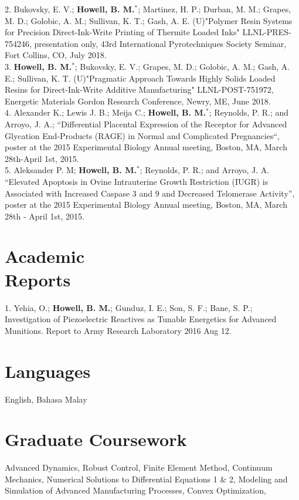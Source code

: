 \documentclass[margin,line]{res}
\begin{document}
\begin{resume}
2. Bukovsky, E. V.; \textbf{Howell, B. M.}$^*$; Martinez, H. P.; Durban, M. M.; Grapes, M. D.; Golobic, A. M.; Sullivan, K. T.; Gash, A. E. (U)"Polymer Resin Systems for Precision Direct-Ink-Write Printing of Thermite Loaded Inks" LLNL-PRES-754246, presentation only, 43rd International Pyrotechniques Society Seminar, Fort Collins, CO, July 2018.\\

3. \textbf{Howell, B. M.}$^*$; Bukovsky, E. V.; Grapes, M. D.; Golobic, A. M.; Gash, A. E.; Sullivan, K. T. (U)"Pragmatic Approach Towards Highly Solids Loaded Resins for Direct-Ink-Write Additive Manufacturing" LLNL-POST-751972, Energetic Materials Gordon Research Conference, Newry, ME, June 2018.\\

4. Alexander K.; Lewis J. B.; Meija C.; \textbf{Howell, B. M.}$^*$; Reynolds, P. R.; and Arroyo, J. A.; “Differential Placental Expression of the Receptor for Advanced Glycation End-Products (RAGE) in Normal and Complicated Pregnancies“, poster at the 2015 Experimental Biology Annual meeting, Boston, MA, March 28th-April 1st, 2015.\\

5. Aleksander P. M; \textbf{Howell, B. M.}$^*$; Reynolds, P. R.; and Arroyo, J. A. “Elevated Apoptosis in Ovine Intrauterine Growth Restriction (IUGR) is Associated with Increased Caspase 3 and 9 and Decreased Telomerase Activity”, poster at the 2015 Experimental Biology Annual meeting, Boston, MA, March 28th - April 1st, 2015.\\

\section{\sc Academic \\ Reports}
1. Yehia, O.; \textbf{Howell, B. M.}; Gunduz, I. E.; Son, S. F.; Bane, S. P.; Investigation of Piezoelectric Reactives as Tunable Energetics for Advanced Munitions. Report to Army Research Laboratory 2016 Aug 12.

\section{\sc Languages}
English, Bahasa Malay\\

\section{\sc Graduate Coursework}
Advanced Dynamics, Robust Control, Finite Element Method, Continuum Mechanics, Numerical Solutions to Differential Equations 1 \& 2, Modeling and Simulation of Advanced Manufacturing Processes, Convex Optimization, 
\\

\end{resume}
\end{document}
